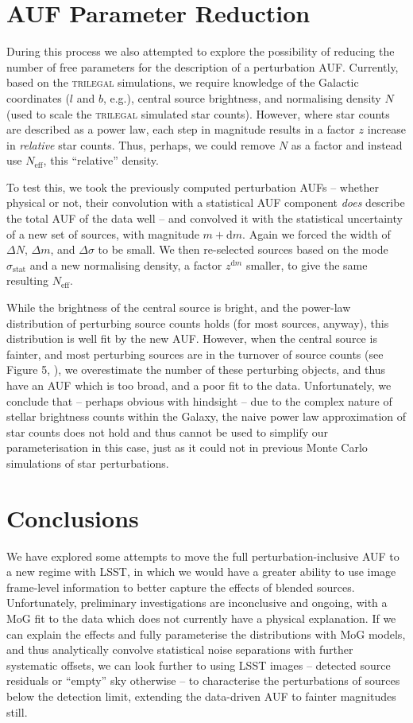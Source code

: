 \documentclass[fleqn,usenatbib]{mnras}
\begin{document}
\section{AUF Parameter Reduction}
During this process we also attempted to explore the possibility of reducing the number of free parameters for the description of a perturbation AUF. Currently, based on the \textsc{trilegal} simulations, we require knowledge of the Galactic coordinates ($l$ and $b$, e.g.), central source brightness, and normalising density $N$ (used to scale the \textsc{trilegal} simulated star counts). However, where star counts are described as a power law, each step in magnitude results in a factor $z$ increase in \textit{relative} star counts. Thus, perhaps, we could remove $N$ as a factor and instead use $N_\mathrm{eff}$, this ``relative'' density.

To test this, we took the previously computed perturbation AUFs -- whether physical or not, their convolution with a statistical AUF component \textit{does} describe the total AUF of the data well -- and convolved it with the statistical uncertainty of a new set of sources, with magnitude $m+\mathrm{d}m$. Again we forced the width of $\Delta N$, $\Delta m$, and $\Delta\sigma$ to be small. We then re-selected sources based on the mode $\sigma_\mathrm{stat}$ and a new normalising density, a factor $z^{\mathrm{d}m}$ smaller, to give the same resulting $N_\mathrm{eff}$.

While the brightness of the central source is bright, and the power-law distribution of perturbing source counts holds (for most sources, anyway), this distribution is well fit by the new AUF. However, when the central source is fainter, and most perturbing sources are in the turnover of source counts (see Figure 5, \citealt{2018MNRAS.481.2148W}), we overestimate the number of these perturbing objects, and thus have an AUF which is too broad, and a poor fit to the data. Unfortunately, we conclude that -- perhaps obvious with hindsight -- due to the complex nature of stellar brightness counts within the Galaxy, the naive power law approximation of star counts does not hold and thus cannot be used to simplify our parameterisation in this case, just as it could not in previous Monte Carlo simulations of star perturbations.

\section{Conclusions}
We have explored some attempts to move the full perturbation-inclusive AUF to a new regime with LSST, in which we would have a greater ability to use image frame-level information to better capture the effects of blended sources. Unfortunately, preliminary investigations are inconclusive and ongoing, with a MoG fit to the data which does not currently have a physical explanation. If we can explain the effects and fully parameterise the distributions with MoG models, and thus analytically convolve statistical noise separations with further systematic offsets, we can look further to using LSST images -- detected source residuals or ``empty'' sky otherwise -- to characterise the perturbations of sources below the detection limit, extending the data-driven AUF to fainter magnitudes still.
\end{document}
